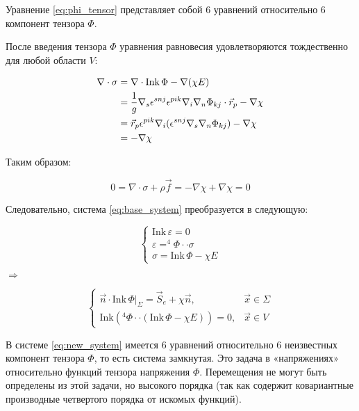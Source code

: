 Уравнение \eqref{eq:phi_tensor} представляет собой 6 уравнений относительно 6 компонент тензора \( \Phi \).

После введения тензора \( \Phi \) уравнения равновесия удовлетворяются тождественно для любой области \( V \):

\begin{align}\label{eq:equilibrium}
    \nabla \cdot \sigma 
    &= \nabla \cdot \text{Ink} \, \Phi - \nabla (\chi E) \notag \\
    &= \frac{1}{g} \nabla_s \epsilon^{snj} \epsilon^{pik} \nabla_i \nabla_n \Phi_{kj} \cdot \vec{r}_p 
    - \nabla \chi \notag \\
    &= \vec{r}_p \epsilon^{pik} \nabla_i (\epsilon^{snj} \nabla_s \nabla_n \Phi_{kj}) - \nabla \chi \notag \\
    &= -\nabla \chi
\end{align}

Таким образом:

\begin{equation}\label{eq:balance}
    0 = \nabla \cdot \sigma + \rho \vec{f} = -\nabla \chi + \nabla \chi = 0
\end{equation}

Следовательно, система \eqref{eq:base_system} преобразуется в следующую:

\begin{equation}\label{eq:new_system}
    \begin{cases}
        \text{Ink} \, \varepsilon = 0 \\
        \varepsilon = ^4\Phi \cdot\cdot \sigma \\
        \sigma = \text{Ink} \, \Phi - \chi E
    \end{cases}
\end{equation}

$\Rightarrow$

\begin{equation}\label{eq:boundary_conditions}
    \begin{cases}
        \vec{n} \cdot \text{Ink} \, \Phi |_{\Sigma} = \vec{S}_e + \chi \vec{n}, & \vec{x} \in \Sigma \\
        \text{Ink} \left(^4\Phi \cdot\cdot (\text{Ink} \, \Phi - \chi E)\right) = 0, & \vec{x} \in V
    \end{cases}
\end{equation}

В системе \eqref{eq:new_system} имеется 6 уравнений относительно 6 неизвестных компонент тензора \( \Phi \), то есть система замкнутая. Это задача в «напряжениях» относительно функций тензора напряжения \( \Phi \). Перемещения не могут быть определены из этой задачи, но высокого порядка (так как содержит ковариантные производные четвертого порядка от
искомых функций).


